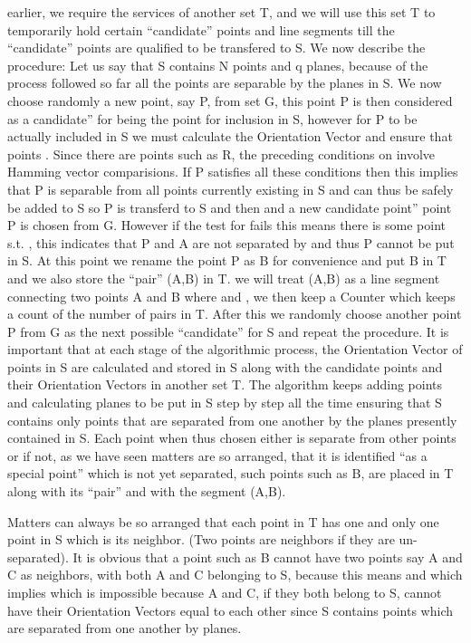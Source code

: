 \documentclass[english]{article}
\begin{document}
earlier, we require the services of another set T, and we will use
this set T to temporarily hold certain {}``candidate'' points and
line segments till the {}``candidate'' points are qualified to be
transfered to S. We now describe the procedure: Let us say that S
contains N points and q planes, because of the process followed so
far all the points  are separable by the  planes in S. We
now choose randomly a new point, say P, from set G, this point P is
then considered as a \textquotedbl{}candidate'' for being the 
point for inclusion in S, however for P to be actually included in
S we must calculate the Orientation Vector  and ensure that
 points . Since there are  points
such as R, the preceding conditions on  involve  Hamming
vector comparisions. If P satisfies all these conditions then this
implies that P is separable from all points currently existing in
S and can thus be safely be added to S so P is transferd to S and
then  and a new \textquotedbl{}candidate point''
point P is chosen from G. However if the test for  fails this
means there is some point  s.t.  , this indicates
that P and A are not separated by  and thus P cannot be put in
S. At this point we rename the point P as B for convenience and put
B in T and we also store the {}``pair'' (A,B) in T. we will treat
(A,B) as a line segment connecting two points A and B where 
and , we then keep a Counter which keeps a count of the
number of pairs in T. After this we randomly choose another point
P from G as the next possible {}``candidate'' for S and repeat the
procedure. It is important that at each stage of the algorithmic process,
the Orientation Vector of points in S are calculated and stored in
S along with the \textquotedbl{}candidate\textquotedbl{} points and
their Orientation Vectors in another set T. The algorithm keeps adding
points and calculating planes to be put in S step by step all the
time ensuring that S contains only points that are separated from
one another by the  planes presently contained in S. Each point
when thus chosen either is separate from other points or if not, as
we have seen matters are so arranged, that it is identified {}``as
a special point'' which is not yet separated, such points such as
B, are placed in T along with its {}``pair'' and with the segment
(A,B).

Matters can always be so arranged that each point in T has one and
only one point in S which is its neighbor. (Two points are neighbors
if they are un-separated). It is obvious that a point such as B cannot
have two points say A and C as neighbors, with both A and C belonging to S,
 because this means  and  which implies 
which is impossible because A and C, if they both belong to S, cannot
have their Orientation Vectors equal to each other since S contains
points which are separated from one another by  planes.
\end{document}

